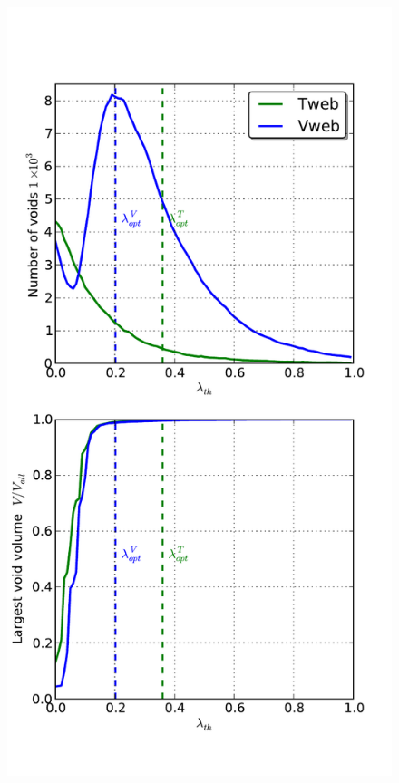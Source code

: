\documentclass[a4,useAMS,usenatbib,usegraphicx]{latex/mn2e}
\begin{document}
\begin{flushleft}
\begin{figure}
\centering

  \includegraphics[trim = 1mm 10mm 8mm 18mm, clip, keepaspectratio=true,
  width=0.25\textheight]{./figures/voids_regions_percolation_FOF.pdf}


\end{figure}
\end{flushleft}
\end{document}
